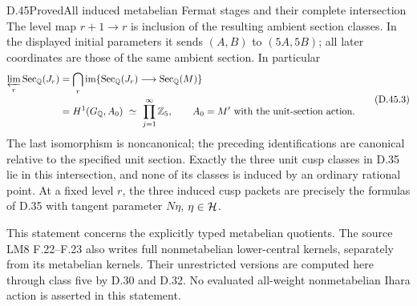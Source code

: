 \begin{statement}{D.45}{Proved}{All induced metabelian Fermat stages and their complete intersection}
The level map \(r+1\to r\) is inclusion of the resulting
ambient section classes. In the displayed initial
parameters it sends \((A,B)\) to \((5A,5B)\);
all later coordinates are those of the same ambient
section. In particular
\[
 \begin{split}
 \varprojlim_r\operatorname{Sec}_{\mathbb Q}(J_r)
 &=\bigcap_r
   \operatorname{im}\{\operatorname{Sec}_{\mathbb Q}(J_r)
                         \longrightarrow
                       \operatorname{Sec}_{\mathbb Q}(M)\}\\
 &=H^1(G_{\mathbb Q},A_0)
       \ \simeq\ \prod_{j=1}^{\infty}\mathbb Z_5 ,
 \qquad A_0=M'\text{ with the unit-section action}.
 \end{split}                                                   \tag{D.45.3}
\]
The last isomorphism is noncanonical; the preceding
identifications are canonical relative to the specified
unit section. Exactly the three unit cusp classes in
D.35 lie in this intersection, and none of its classes
is induced by an ordinary rational point.
At a fixed level \(r\), the three induced cusp packets
are precisely the formulas of D.35 with tangent
parameter \(N\eta\), \(\eta\in{\cal H}\).

This statement concerns the explicitly typed metabelian
quotients. The source LM8 F.22--F.23 also writes full
nonmetabelian lower-central kernels, separately from its
metabelian kernels. Their unrestricted versions are
computed here through class five by D.30 and D.32.
No evaluated all-weight nonmetabelian Ihara action is
asserted in this statement.
\end{statement}
